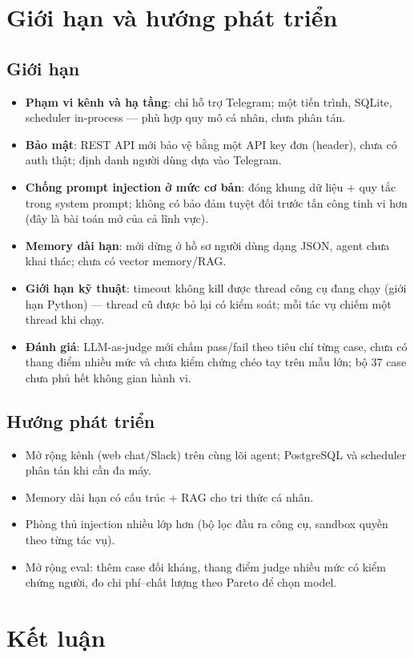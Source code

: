 \section{Giới hạn và hướng phát triển}
\label{sec:gioi-han}

\subsection{Giới hạn}

\begin{itemize}
  \item \textbf{Phạm vi kênh và hạ tầng}: chỉ hỗ trợ Telegram; một tiến trình,
        SQLite, scheduler in-process --- phù hợp quy mô cá nhân, chưa phân tán.
  \item \textbf{Bảo mật}: REST API mới bảo vệ bằng một API key đơn (header),
        chưa có auth thật; định danh người dùng dựa vào Telegram.
  \item \textbf{Chống prompt injection ở mức cơ bản}: đóng khung dữ liệu +
        quy tắc trong system prompt; không có bảo đảm tuyệt đối trước tấn công
        tinh vi hơn (đây là bài toán mở của cả lĩnh vực).
  \item \textbf{Memory dài hạn}: mới dừng ở hồ sơ người dùng dạng JSON, agent
        chưa khai thác; chưa có vector memory/RAG.
  \item \textbf{Giới hạn kỹ thuật}: timeout không kill được thread công cụ
        đang chạy (giới hạn Python) --- thread cũ được bỏ lại có kiểm soát;
        mỗi tác vụ chiếm một thread khi chạy.
  \item \textbf{Đánh giá}: LLM-as-judge mới chấm pass/fail theo tiêu chí từng
        case, chưa có thang điểm nhiều mức và chưa kiểm chứng chéo tay trên
        mẫu lớn; bộ 37 case chưa phủ hết không gian hành vi.
\end{itemize}

\subsection{Hướng phát triển}

\begin{itemize}
  \item Mở rộng kênh (web chat/Slack) trên cùng lõi agent; PostgreSQL và
        scheduler phân tán khi cần đa máy.
  \item Memory dài hạn có cấu trúc + RAG cho tri thức cá nhân.
  \item Phòng thủ injection nhiều lớp hơn (bộ lọc đầu ra công cụ, sandbox
        quyền theo từng tác vụ).
  \item Mở rộng eval: thêm case đối kháng, thang điểm judge nhiều mức có kiểm
        chứng người, đo chi phí--chất lượng theo Pareto để chọn model.
\end{itemize}

\section*{Kết luận}

